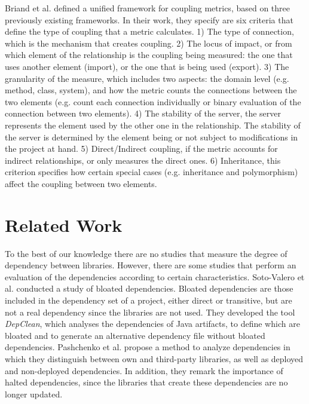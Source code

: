 \documentclass[a4paper]{article}
\begin{document}
Briand et al. \cite{briand1999unified} defined a unified framework for coupling metrics, based on three previously existing frameworks. In their work, they specify are six criteria that define the type of coupling that a metric calculates. 1) The type of connection, which is the mechanism that creates coupling. 2) The locus of impact, or from which element of the relationship is the coupling being measured: the one that uses another element (import), or the one that is being used (export). 3) The granularity of the measure, which includes two aspects: the domain level (e.g. method, class, system), and how the metric counts the connections between the two elements (e.g. count each connection individually or binary evaluation of the connection between two elements). 4) The stability of the server, the server represents the element used by the other one in the relationship. The stability of the server is determined by the element being or not subject to modifications in the project at hand. 5) Direct/Indirect coupling, if the metric accounts for indirect relationships, or only measures the direct ones. 6) Inheritance, this criterion specifies how certain special cases (e.g. inheritance and polymorphism) affect the coupling between two elements.

\section{Related Work}
To the best of our knowledge there are no studies that measure the degree of dependency between libraries. However, there are some studies that perform an evaluation of the dependencies according to certain characteristics.
Soto-Valero et al. \cite{soto2020comprehensive} conducted a study of bloated dependencies. Bloated dependencies are those included in the dependency set of a project, either direct or transitive, but are not a real dependency since the libraries are not used. They developed the tool \textit{DepClean}, which analyses the dependencies of Java artifacts, to define which are bloated and to generate an alternative dependency file without bloated dependencies.
Pashchenko et al. \cite{pashchenko2018vulnerable} propose a method to analyze dependencies in which they distinguish between own and third-party libraries, as well as deployed and non-deployed dependencies. In addition, they remark the importance of halted dependencies, since the libraries that create these dependencies are no longer updated.
\end{document}
